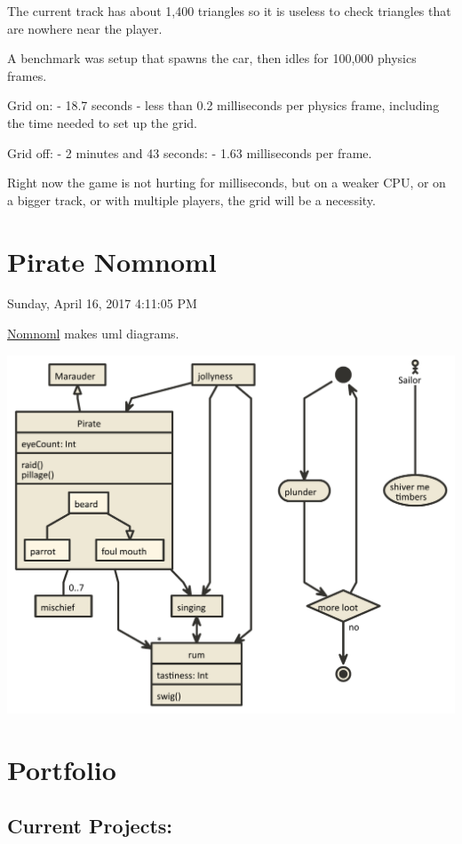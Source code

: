 \documentclass[]{book}
\begin{document}
The current track has about 1,400 triangles so it is useless to check
triangles that are nowhere near the player.

A benchmark was setup that spawns the car, then idles for 100,000
physics frames.

Grid on: - 18.7 seconds - less than 0.2 milliseconds per physics frame,
including the time needed to set up the grid.

Grid off: - 2 minutes and 43 seconds: - 1.63 milliseconds per frame.

Right now the game is not hurting for milliseconds, but on a weaker CPU,
or on a bigger track, or with multiple players, the grid will be a
necessity.

\chapter{Pirate Nomnoml}\label{pirate-nomnoml}

 Sunday, April 16, 2017 4:11:05 PM

\href{http://nomnoml.com}{Nomnoml} makes uml diagrams.

\includegraphics{Image/Pirate.nomnoml.pdf}

\chapter{Portfolio}\label{portfolio}

\section{Current Projects:}\label{current-projects}
\end{document}
